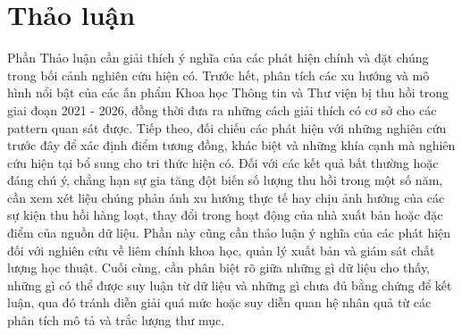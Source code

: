 \section{Thảo luận}

Phần Thảo luận cần giải thích ý nghĩa của các phát hiện chính và đặt chúng trong bối cảnh nghiên cứu hiện có. Trước hết, phân tích các xu hướng và mô hình nổi bật của các ấn phẩm Khoa học Thông tin và Thư viện bị thu hồi trong giai đoạn 2021 - 2026, đồng thời đưa ra những cách giải thích có cơ sở cho các pattern quan sát được. Tiếp theo, đối chiếu các phát hiện với những nghiên cứu trước đây để xác định điểm tương đồng, khác biệt và những khía cạnh mà nghiên cứu hiện tại bổ sung cho tri thức hiện có. Đối với các kết quả bất thường hoặc đáng chú ý, chẳng hạn sự gia tăng đột biến số lượng thu hồi trong một số năm, cần xem xét liệu chúng phản ánh xu hướng thực tế hay chịu ảnh hưởng của các sự kiện thu hồi hàng loạt, thay đổi trong hoạt động của nhà xuất bản hoặc đặc điểm của nguồn dữ liệu. Phần này cũng cần thảo luận ý nghĩa của các phát hiện đối với nghiên cứu về liêm chính khoa học, quản lý xuất bản và giám sát chất lượng học thuật. Cuối cùng, cần phân biệt rõ giữa những gì dữ liệu cho thấy, những gì có thể được suy luận từ dữ liệu và những gì chưa đủ bằng chứng để kết luận, qua đó tránh diễn giải quá mức hoặc suy diễn quan hệ nhân quả từ các phân tích mô tả và trắc lượng thư mục.
